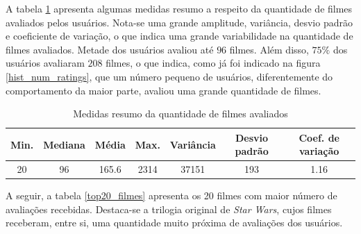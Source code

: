 \documentclass[12pt,a4paper,header]{abnt}
\begin{document}
A tabela \ref{resumo_rating} apresenta algumas medidas resumo a respeito da quantidade de filmes avaliados pelos usuários. Nota-se uma grande amplitude, variância, desvio padrão e coeficiente de variação, o que indica uma grande variabilidade na quantidade de filmes avaliados. Metade dos usuários avaliou até $96$ filmes. Além disso, $75\%$ dos usuários avaliaram $208$ filmes, o que indica, como já foi indicado na figura \ref{hist_num_ratings}, que um número pequeno de usuários, diferentemente do comportamento da maior parte, avaliou uma grande quantidade de filmes.

\begin{table}[h]
\caption{Medidas resumo da quantidade de filmes avaliados}
\label{resumo_rating}
\centering
\begin{tabular}{@{}ccccccc@{}}
\toprule
\textbf{Min.} & \textbf{Mediana} & \textbf{Média} & \textbf{Max.} & \textbf{Variância} & \textbf{Desvio padrão} & \textbf{Coef. de variação} \\ \midrule
20            & 96               & 165.6          & 2314          & 37151              & 193                    & 1.16                       \\ \bottomrule
\end{tabular}
\end{table}

A seguir, a tabela \ref{top20_filmes} apresenta os 20 filmes com maior número de avaliações recebidas. Destaca-se a trilogia original de \textit{Star Wars}, cujos filmes receberam, entre si, uma quantidade muito próxima de avaliações dos usuários.
\end{document}
